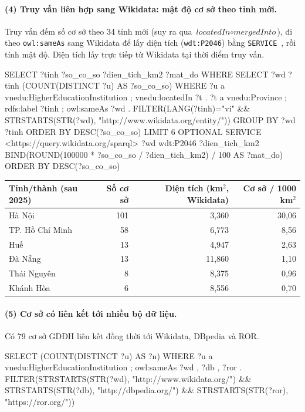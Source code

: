 \documentclass[12pt,a4paper]{article}
\begin{document}
\paragraph{(4) Truy vấn liên hợp sang Wikidata: mật độ cơ sở theo tỉnh mới.} Truy vấn đếm số cơ sở theo 34 tỉnh mới (suy
ra qua \(\textit{locatedIn}\circ\textit{mergedInto}\)), đi theo \texttt{owl:sameAs} sang Wikidata để lấy diện tích
(\texttt{wdt:P2046}) bằng \texttt{SERVICE}~\cite{w3c2013sparqlfed}, rồi tính mật độ. Diện tích lấy trực tiếp từ Wikidata
tại thời điểm truy vấn.
\begin{code}
SELECT ?tinh ?so_co_so ?dien_tich_km2 ?mat_do WHERE {
  { SELECT ?wd ?tinh (COUNT(DISTINCT ?u) AS ?so_co_so) WHERE {
      ?u a vnedu:HigherEducationInstitution ; vnedu:locatedIn ?t .
      ?t a vnedu:Province ; rdfs:label ?tinh ; owl:sameAs ?wd .
      FILTER(LANG(?tinh)="vi"
             && STRSTARTS(STR(?wd), "http://www.wikidata.org/entity/"))
    } GROUP BY ?wd ?tinh ORDER BY DESC(?so_co_so) LIMIT 6 }
  OPTIONAL { SERVICE <https://query.wikidata.org/sparql> {
               ?wd wdt:P2046 ?dien_tich_km2 } }
  BIND(ROUND(100000 * ?so_co_so / ?dien_tich_km2) / 100 AS ?mat_do)
} ORDER BY DESC(?so_co_so)
\end{code}
\begin{center}\small
\begin{tabular}{lrrr}
\toprule
Tỉnh/thành (sau 2025) & Số cơ sở & Diện tích (km\(^2\), Wikidata) & Cơ sở / 1000 km\(^2\) \\
\midrule
Hà Nội & 101 & 3{,}360 & 30,06 \\
TP. Hồ Chí Minh & 58 & 6{,}773 & 8,56 \\
Huế & 13 & 4{,}947 & 2,63 \\
Đà Nẵng & 13 & 11{,}860 & 1,10 \\
Thái Nguyên & 8 & 8{,}375 & 0,96 \\
Khánh Hòa & 6 & 8{,}556 & 0,70 \\
\bottomrule
\end{tabular}
\end{center}

\paragraph{(5) Cơ sở có liên kết tới nhiều bộ dữ liệu.} Có 79 cơ sở GDĐH liên kết đồng thời tới Wikidata, DBpedia và ROR.
\begin{code}
SELECT (COUNT(DISTINCT ?u) AS ?n) WHERE {
  ?u a vnedu:HigherEducationInstitution ; owl:sameAs ?wd , ?db , ?ror .
  FILTER(STRSTARTS(STR(?wd), "http://www.wikidata.org/")
         && STRSTARTS(STR(?db), "http://dbpedia.org/")
         && STRSTARTS(STR(?ror), "https://ror.org/"))
}
\end{code}
\end{document}

